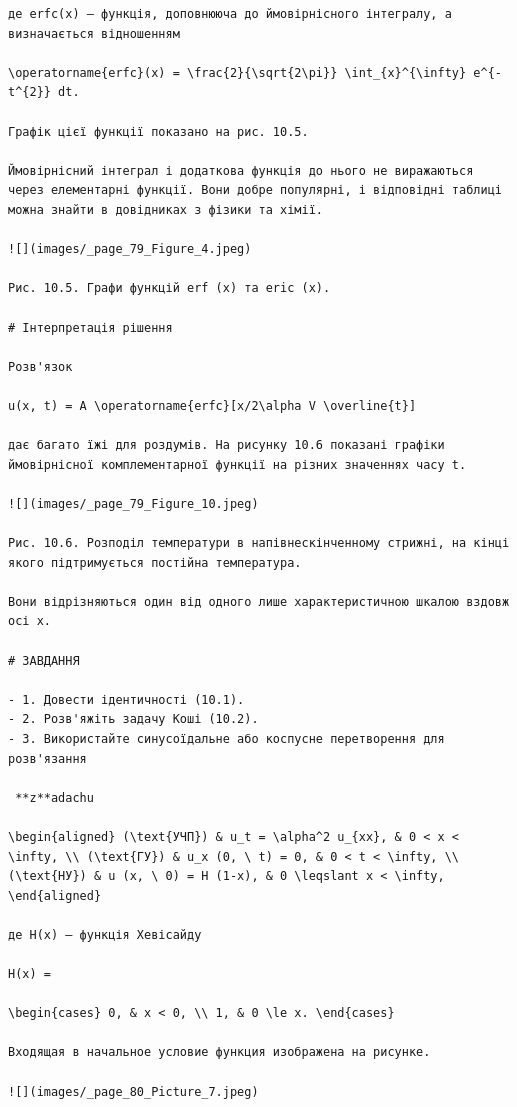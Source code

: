 \documentclass[
  ukrainian,
]{article}
\begin{document}
\begin{verbatim}
де erfc(x) — функція, доповнююча до ймовірнісного інтегралу, а визначається відношенням

\operatorname{erfc}(x) = \frac{2}{\sqrt{2\pi}} \int_{x}^{\infty} e^{-t^{2}} dt.

Графік цієї функції показано на рис. 10.5.

Ймовірнісний інтеграл і додаткова функція до нього не виражаються через елементарні функції. Вони добре популярні, і відповідні таблиці можна знайти в довідниках з фізики та хімії.

![](images/_page_79_Figure_4.jpeg)

Рис. 10.5. Графи функцій erf (x) та eric (x).

# Інтерпретація рішення

Розв'язок

u(x, t) = A \operatorname{erfc}[x/2\alpha V \overline{t}]

дає багато їжі для роздумів. На рисунку 10.6 показані графіки ймовірнісної комплементарної функції на різних значеннях часу t.

![](images/_page_79_Figure_10.jpeg)

Рис. 10.6. Розподіл температури в напівнескінченному стрижні, на кінці якого підтримується постійна температура.

Вони відрізняються один від одного лише характеристичною шкалою вздовж осі x.

# ЗАВДАННЯ

- 1. Довести ідентичності (10.1).
- 2. Розв'яжіть задачу Коші (10.2).
- 3. Використайте синусоїдальне або коспусне перетворення для розв'язання

 **z**adachu

\begin{aligned} (\text{УЧП}) & u_t = \alpha^2 u_{xx}, & 0 < x < \infty, \\ (\text{ГУ}) & u_x (0, \ t) = 0, & 0 < t < \infty, \\ (\text{НУ}) & u (x, \ 0) = H (1-x), & 0 \leqslant x < \infty, \end{aligned}

де H(x) — функція Хевісайду

H(x) =

\begin{cases} 0, & x < 0, \\ 1, & 0 \le x. \end{cases}

Входящая в начальное условие функция изображена на рисунке.

![](images/_page_80_Picture_7.jpeg)


\end{verbatim}
\end{document}
